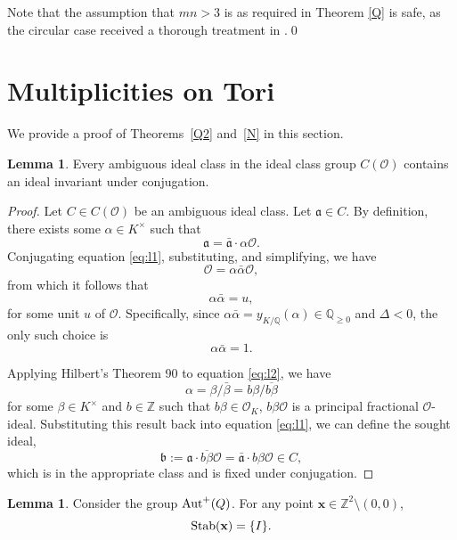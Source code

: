 \documentclass[11pt]{amsart}
\theoremstyle{definition}
\newtheorem{lemma}[theorem]{Lemma}
\begin{document}
Note that the assumption that $mn>3$ is as required in Theorem \ref{Q} is safe, as the circular case received a thorough treatment in \cite{Fu2025-ph}.\qed

\section{Multiplicities on Tori}\label{s:tori}

We provide a proof of Theorems~\ref{Q2} and~\ref{N} in this section. 

\begin{lemma}\label{Ambiguous_Ideal}
    Every ambiguous ideal class in the ideal class group $C(\mathcal{O})$ contains an ideal invariant under conjugation.
\end{lemma}

\begin{proof}
    Let $C\in C(\mathcal{O})$ be an ambiguous ideal class. Let $\mathfrak{a}\in C$. By definition, there exists some $\alpha \in K^\times$ such that 
    \begin{equation}\label{eq:l1}
        \mathfrak{a}=\mathfrak{\bar{a}}\cdot \alpha\mathcal{O}.
    \end{equation}
    Conjugating equation \eqref{eq:l1}, substituting, and simplifying, we have 
    \[
        \mathcal{O}=\alpha\bar{\alpha}\mathcal{O},
    \]
    from which it follows that 
    \[
        \alpha\bar{\alpha}=u,
    \]
    for some unit $u$ of $\mathcal{O}$. Specifically, since $\alpha\bar{\alpha}=y_{K/\mathbb{Q}}(\alpha)\in\mathbb{Q}_{\geq 0}$ and $\Delta<0$, the only such choice is
    \begin{equation}\label{eq:l2}
        \alpha\bar{\alpha}=1.
    \end{equation}
    
    Applying Hilbert's Theorem 90 to equation \eqref{eq:l2}, we have \[\alpha=\beta/\bar{\beta}=b\beta/\overline{b\beta}\] for some $\beta\in K^\times$ and $b\in\mathbb{Z}$ such that $b\beta\in\mathcal{O}_K$, $b\beta\mathcal{O}$ is a principal fractional $\mathcal{O}$-ideal. Substituting this result back into equation \eqref{eq:l1}, we can define the sought ideal, \[\mathfrak{b}:=\mathfrak{a}\cdot\overline{b\beta}\mathcal{O}=\mathfrak{\bar{a}}\cdot b\beta\mathcal{O}\in C,\] which is in the appropriate class and is fixed under conjugation.
\end{proof}

\begin{lemma}\label{Stabilizers}
    Consider the group $\textup{Aut}^+(Q)$. For any point $\mathbf{x}\in\mathbb{Z}^2\setminus(0,0)$, \[\textup{Stab}(\mathbf{x})=\{I\}.\]
\end{lemma}
\end{document}
